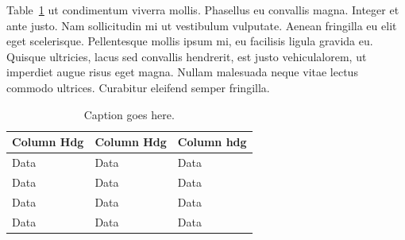 Table~\ref{tab:tab1} ut condimentum viverra mollis. Phasellus eu convallis magna. Integer et ante justo.
Nam sollicitudin mi ut vestibulum vulputate. Aenean fringilla eu elit eget scelerisque. Pellentesque
mollis ipsum mi, eu facilisis ligula gravida eu. Quisque ultricies, lacus sed convallis hendrerit,
est justo vehiculalorem, ut imperdiet augue risus eget magna. Nullam malesuada neque vitae lectus
commodo ultrices. Curabitur eleifend semper fringilla.  

\begin{table}[h!]
    \centering
    \caption{\small{Caption goes here.}}
    \label{tab:tab1}
    \begin{tabular*}{0.99\columnwidth}{p{1.12in} p{1.12in} p{1.12in}}
        \toprule
        Column Hdg & Column Hdg & Column hdg\\
        \midrule
        Data & Data & Data \\
        Data & Data & Data \\
        Data & Data & Data \\
        Data & Data & Data \\
        \bottomrule
    \end{tabular*}
\end{table}

\endinput

